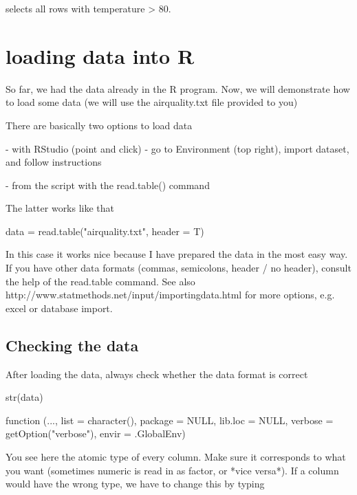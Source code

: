 \documentclass[a4paper,twoside]{tufte-book}\usepackage[]{graphicx}\usepackage[]{color}
\begin{document}
\begin{appendices}
selects all rows with temperature > 80.


\section{loading data into R}

So far, we had the data already in the R program. Now, we will demonstrate how to load some data (we will use the airquality.txt file provided to you)

There are basically two options to load data

- with RStudio (point and click) - go to Environment (top right), import dataset, and follow instructions

- from the script with the read.table() command

The latter works like that


\begin{Schunk}
\begin{Sinput}
data = read.table("airquality.txt", header = T)
\end{Sinput}
\end{Schunk}

In this case it works nice because I have prepared the data in the most easy way. If you have other data formats (commas, semicolons, header / no header), consult the help of the read.table command. See also http://www.statmethods.net/input/importingdata.html for more options, e.g. excel or database import. 

\subsection{Checking the data}

After loading the data, always check whether the data format is correct 

\begin{Schunk}
\begin{Sinput}
str(data)
\end{Sinput}
\begin{Soutput}
function (..., list = character(), package = NULL, lib.loc = NULL, 
    verbose = getOption("verbose"), envir = .GlobalEnv)  
\end{Soutput}
\end{Schunk}

You see here the atomic type of every column. Make sure it corresponds to what you want (sometimes numeric is read in as factor, or *vice versa*). If a column would have the wrong type, we have to change this by typing


\end{appendices}
\end{document}
